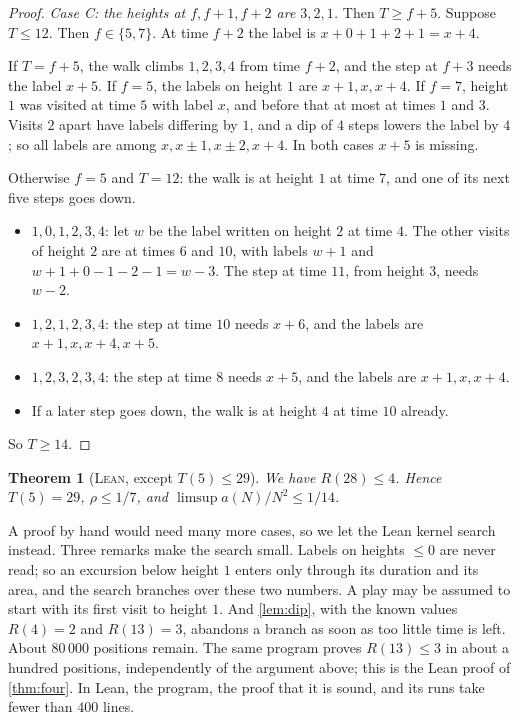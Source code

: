 \documentclass[11pt]{amsart}
\newtheorem{theorem}{Theorem}[section]
\theoremstyle{definition}
\newcommand{\LEAN}{\textsc{Lean}}
\begin{document}
\begin{proof}
\emph{Case C: the heights at $f,f+1,f+2$ are $3,2,1$.} Then $T\ge f+5$. Suppose $T\le12$. Then $f\in\{5,7\}$. At time $f+2$
the label is $x+0+1+2+1=x+4$.

If $T=f+5$, the walk climbs $1,2,3,4$ from time $f+2$, and the step at $f+3$ needs the label $x+5$. If $f=5$, the labels
on height $1$ are $x+1,x,x+4$. If $f=7$, height $1$ was visited at time $5$ with label $x$, and
before that at most at times $1$ and $3$. Visits $2$ apart have labels differing by $1$, and a dip of $4$ steps lowers the label
by $4$; so all labels are among $x,x\pm1,x\pm2,x+4$. In both cases $x+5$ is missing.

Otherwise $f=5$ and $T=12$: the walk is at height $1$ at time $7$, and one of its next five steps goes down.
\begin{itemize}[leftmargin=*]
 \item $1,0,1,2,3,4$: let $w$ be the label written on height $2$ at time $4$. The other visits of height $2$ are at times
 $6$ and $10$, with labels $w+1$ and $w+1+0-1-2-1=w-3$. The step at time $11$, from height $3$, needs $w-2$.
 \item $1,2,1,2,3,4$: the step at time $10$ needs $x+6$, and the labels are $x+1,x,x+4,x+5$.
 \item $1,2,3,2,3,4$: the step at time $8$ needs $x+5$, and the labels are $x+1,x,x+4$.
 \item If a later step goes down, the walk is at height $4$ at time $10$ already.
\end{itemize}
So $T\ge14$.
\end{proof}

\begin{theorem}[\LEAN, except $T(5)\le29$]\label{thm:five}
We have $R(28)\le4$. Hence $T(5)=29$, $\rho\le1/7$, and $\limsup a(N)/N^2\le1/14$.
\end{theorem}

A proof by hand would need many more cases, so we let the Lean kernel search instead. Three remarks make the search small. Labels on heights $\le0$ are never
read; so an excursion below height $1$ enters only through its duration and its area, and the search branches
over these two numbers. A play may be assumed to start with its first visit to height $1$. And \cref{lem:dip}, with the known
values $R(4)=2$ and $R(13)=3$, abandons a branch as soon as too little time is left. About $80\,000$ positions remain. The
same program proves $R(13)\le3$ in about a hundred positions, independently of the argument above; this is the Lean proof of
\cref{thm:four}. In Lean, the
program, the proof that it is sound, and its runs take fewer than $400$ lines.
\end{document}

